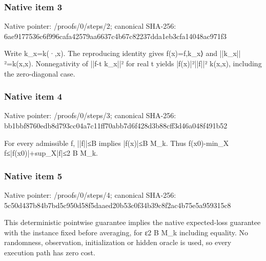\documentclass[10pt,a4paper]{article}
\begin{document}
\subsubsection{Native item 3}
Native pointer: /proofs/0/steps/2; canonical SHA-256: 6ae9177536c6f996cafa42579aa6637c4b67c82237dda1eb3cfa14048ac971f3

\begingroup\raggedright\sloppy Write k\_\allowbreak{}x=\allowbreak{}k({\AtlasUnicodeText ·}\allowbreak{},\allowbreak{}x). The reproducing identity gives f(x)=\allowbreak{}f,\allowbreak{}k\_\allowbreak{}x{\AtlasUnicodeSymbols ⟩}\allowbreak{} and ||k\_\allowbreak{}x||{\AtlasUnicodeText ²}\allowbreak{}=\allowbreak{}k(x,\allowbreak{}x). Nonnegativity of ||f-t k\_\allowbreak{}x||{\AtlasUnicodeText ²}\allowbreak{} for real t yields |f(x)|{\AtlasUnicodeText ²}\allowbreak{}||f||{\AtlasUnicodeText ²}\allowbreak{} k(x,\allowbreak{}x),\allowbreak{} including the zero-diagonal case.\par\endgroup

\subsubsection{Native item 4}
Native pointer: /proofs/0/steps/3; canonical SHA-256: bb1bbf8760edb8d793cc04a7c11ff70abb7d6f428d3b88cff3d46a048f491b52

\begingroup\raggedright\sloppy For every admissible f,\allowbreak{} ||f||{\AtlasUnicodeSymbols ≤}\allowbreak{}B implies |f(x)|{\AtlasUnicodeSymbols ≤}\allowbreak{}B M\_\allowbreak{}k. Thus f(x0)-min\_\allowbreak{}X f{\AtlasUnicodeSymbols ≤}\allowbreak{}|f(x0)|+sup\_\allowbreak{}X|f|{\AtlasUnicodeSymbols ≤}\allowbreak{}2 B M\_\allowbreak{}k.\par\endgroup

\subsubsection{Native item 5}
Native pointer: /proofs/0/steps/4; canonical SHA-256: 5c50d437b84b7bd5c950d58f5daaed20b53c0f34b39c8f2ac4b75e5a959315c8

\begingroup\raggedright\sloppy This deterministic pointwise guarantee implies the native expected-loss guarantee with the instance fixed before averaging,\allowbreak{} for {\AtlasUnicodeText ε}\allowbreak{}2 B M\_\allowbreak{}k including equality. No randomness,\allowbreak{} observation,\allowbreak{} initialization or hidden oracle is used,\allowbreak{} so every execution path has zero cost.\par\endgroup
\end{document}

